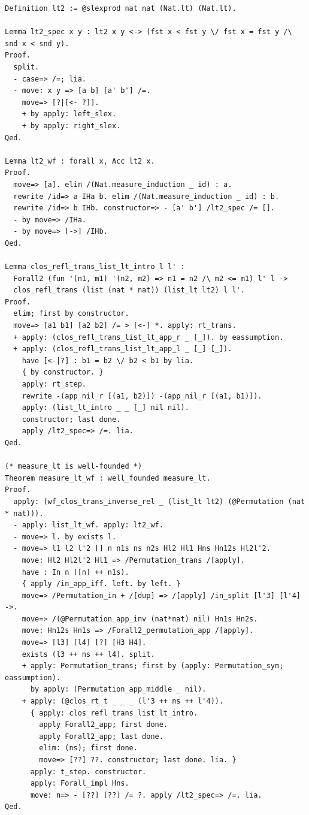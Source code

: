 \begin{lstlisting}[style=authorcoq]
Definition lt2 := @slexprod nat nat (Nat.lt) (Nat.lt).

Lemma lt2_spec x y : lt2 x y <-> (fst x < fst y \/ fst x = fst y /\ snd x < snd y).
Proof.
  split.
  - case=> /=; lia.
  - move: x y => [a b] [a' b'] /=.
    move=> [?|[<- ?]].
    + by apply: left_slex.
    + by apply: right_slex.
Qed.

Lemma lt2_wf : forall x, Acc lt2 x.
Proof.
  move=> [a]. elim /(Nat.measure_induction _ id) : a.
  rewrite /id=> a IHa b. elim /(Nat.measure_induction _ id) : b.
  rewrite /id=> b IHb. constructor=> - [a' b'] /lt2_spec /= [].
  - by move=> /IHa.
  - by move=> [->] /IHb.
Qed.

Lemma clos_refl_trans_list_lt_intro l l' :
  Forall2 (fun '(n1, m1) '(n2, m2) => n1 = n2 /\ m2 <= m1) l' l ->
  clos_refl_trans (list (nat * nat)) (list_lt lt2) l l'.
Proof.
  elim; first by constructor.
  move=> [a1 b1] [a2 b2] /= > [<-] *. apply: rt_trans.
  + apply: (clos_refl_trans_list_lt_app_r _ [_]). by eassumption.
  + apply: (clos_refl_trans_list_lt_app_l _ [_] [_]).
    have [<-|?] : b1 = b2 \/ b2 < b1 by lia.
    { by constructor. }
    apply: rt_step.
    rewrite -(app_nil_r [(a1, b2)]) -(app_nil_r [(a1, b1)]).
    apply: (list_lt_intro _ _ [_] nil nil).
    constructor; last done.
    apply /lt2_spec=> /=. lia.
Qed.

(* measure_lt is well-founded *)
Theorem measure_lt_wf : well_founded measure_lt.
Proof.
  apply: (wf_clos_trans_inverse_rel _ (list_lt lt2) (@Permutation (nat * nat))).
  - apply: list_lt_wf. apply: lt2_wf.
  - move=> l. by exists l.
  - move=> l1 l2 l'2 [] n n1s ns n2s Hl2 Hl1 Hns Hn12s Hl2l'2.
    move: Hl2 Hl2l'2 Hl1 => /Permutation_trans /[apply].
    have : In n ([n] ++ n1s).
    { apply /in_app_iff. left. by left. }
    move=> /Permutation_in + /[dup] => /[apply] /in_split [l'3] [l'4] ->.
    move=> /(@Permutation_app_inv (nat*nat) nil) Hn1s Hn2s.
    move: Hn12s Hn1s => /Forall2_permutation_app /[apply].
    move=> [l3] [l4] [?] [H3 H4].
    exists (l3 ++ ns ++ l4). split.
    + apply: Permutation_trans; first by (apply: Permutation_sym; eassumption).
      by apply: (Permutation_app_middle _ nil).
    + apply: (@clos_rt_t _ _ _ (l'3 ++ ns ++ l'4)).
      { apply: clos_refl_trans_list_lt_intro.
        apply Forall2_app; first done.
        apply Forall2_app; last done.
        elim: (ns); first done.
        move=> [??] ??. constructor; last done. lia. }
      apply: t_step. constructor.
      apply: Forall_impl Hns.
      move: n=> - [??] [??] /= ?. apply /lt2_spec=> /=. lia.
Qed.


\end{lstlisting}
